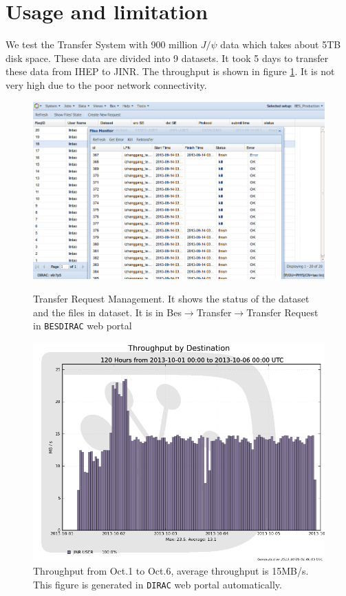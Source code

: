 \section{Usage and limitation}
We test the Transfer System with 900 million $J/\psi$ data 
which takes about 5TB disk space. 
These data are divided into 9 datasets.
It took 5 days to transfer 
these data from IHEP to JINR. The throughput is shown in 
figure \ref{fig:throughput}.
It is not very high due to the poor network connectivity.
\begin{figure}[h]
\begin{minipage}{.49\textwidth}
\includegraphics[width=.95\textwidth, keepaspectratio]{data/transreqlist-with-kill-retransfer.png}
\caption{\label{fig:ui}Transfer Request Management.
It shows the status of the dataset and the files in dataset.
It is in Bes$\to$Transfer$\to$Transfer Request in {\tt BESDIRAC}
web portal}
\end{minipage}
\hspace{.02\textwidth}
\begin{minipage}{.49\textwidth}
\includegraphics[width=.95\textwidth, keepaspectratio]{data/throughput-dest-1001-10-06.png}
\caption{\label{fig:throughput}Throughput from Oct.1 to Oct.6, 
average throughput is 15MB/s. This figure is generated in 
{\tt DIRAC} web portal automatically.}
\end{minipage}
\end{figure}

